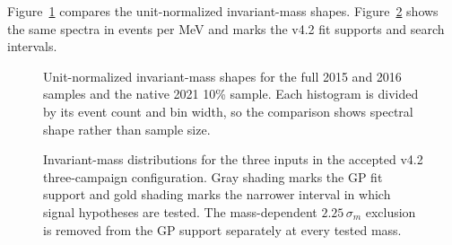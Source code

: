 Figure~\ref{fig:dataset-mass-shape-overlay} compares the unit-normalized invariant-mass
shapes. Figure~\ref{fig:dataset-mass-distributions-log} shows the same spectra in
events per MeV and marks the v4.2 fit supports and search intervals.

\begin{figure}[H]
\centering
{}
\caption{Unit-normalized invariant-mass shapes for the full 2015 and 2016 samples
and the native 2021 10\% sample. Each histogram is divided by its event count and bin
width, so the comparison shows spectral shape rather than sample size.}
\label{fig:dataset-mass-shape-overlay}
\end{figure}

\begin{figure}[H]
\centering
{}
\caption{Invariant-mass distributions for the three inputs in the accepted v4.2
three-campaign configuration. Gray shading marks the GP fit support and gold shading
marks the narrower interval in which signal hypotheses are tested. The mass-dependent
$2.25\,\sigma_m$ exclusion is removed from the GP support separately at every tested
mass.}
\label{fig:dataset-mass-distributions-log}
\end{figure}
